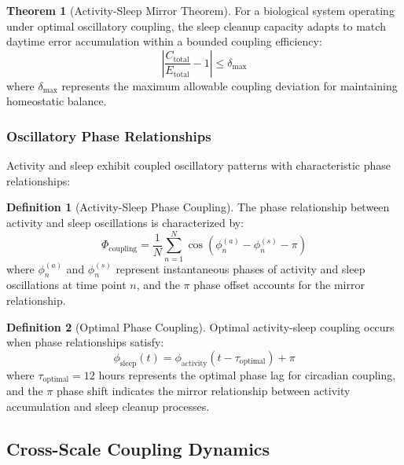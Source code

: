 \documentclass[12pt,a4paper]{article}
\theoremstyle{definition}
\newtheorem{definition}{Definition}[section]
\newtheorem{theorem}{Theorem}[section]
\begin{document}
\begin{theorem}[Activity-Sleep Mirror Theorem]
For a biological system operating under optimal oscillatory coupling, the sleep cleanup capacity adapts to match daytime error accumulation within a bounded coupling efficiency:
\begin{equation}
\left| \frac{C_{\text{total}}}{E_{\text{total}}} - 1 \right| \leq \delta_{\text{max}}
\end{equation}
where $\delta_{\text{max}}$ represents the maximum allowable coupling deviation for maintaining homeostatic balance.
\end{theorem}

\subsubsection{Oscillatory Phase Relationships}

Activity and sleep exhibit coupled oscillatory patterns with characteristic phase relationships:

\begin{definition}[Activity-Sleep Phase Coupling]
The phase relationship between activity and sleep oscillations is characterized by:
\begin{equation}
\Phi_{\text{coupling}} = \frac{1}{N} \sum_{n=1}^{N} \cos(\phi_n^{(a)} - \phi_n^{(s)} - \pi)
\label{eq:phase_coupling}
\end{equation}
where $\phi_n^{(a)}$ and $\phi_n^{(s)}$ represent instantaneous phases of activity and sleep oscillations at time point $n$, and the $\pi$ phase offset accounts for the mirror relationship.
\end{definition}

\begin{definition}[Optimal Phase Coupling]
Optimal activity-sleep coupling occurs when phase relationships satisfy:
\begin{equation}
\phi_{\text{sleep}}(t) = \phi_{\text{activity}}(t - \tau_{\text{optimal}}) + \pi
\end{equation}
where $\tau_{\text{optimal}} = 12$ hours represents the optimal phase lag for circadian coupling, and the $\pi$ phase shift indicates the mirror relationship between activity accumulation and sleep cleanup processes.
\end{definition}

\subsection{Cross-Scale Coupling Dynamics}
\end{document}
